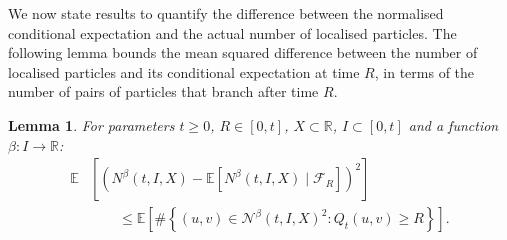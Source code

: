 \documentclass{article}
\newtheorem{lemma}[theorem]{Lemma}
\newcommand{\E}[0]{\mathbb{E}}
\begin{document}
We now state results to quantify the difference between the normalised conditional expectation and the actual number of localised particles. The following lemma bounds the mean squared difference between the number of localised particles and its conditional expectation at time $R$, in terms of the number of pairs of particles that branch after time $R$.
\begin{lemma}\label{lemmaL2bound}
For parameters \( t \geq 0 \), \( R \in [0,t] \), \( X \subset \mathbb{R} \), \( I \subset [0,t] \) and a function \( \beta \colon I \to \mathbb{R} \):
\begin{equation}
        \begin{split}
            \E&\left[ \left(N^{\beta}(t, I,X) - \E\left[N^{\beta}(t, I,X) \mid \mathcal{F}_R \right] \right)^2 \right] \\
            &\qquad \leq \E\left[\#\left\{(u,v) \in \mathcal{N}^\beta(t,I,X)^2 : Q_t(u,v) \geq R \right\}\right].
        \end{split}
\end{equation}
\end{lemma}
\end{document}
